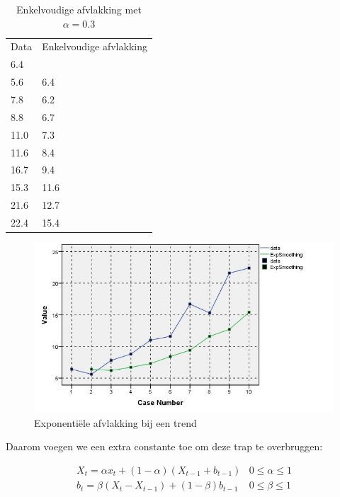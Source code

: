 \begin{table}
\centering
    \begin{tabular}{|ll|}
    \hline
    Data & Enkelvoudige afvlakking \\
    6.4  & ~                      \\
    5.6  & 6.4                    \\
    7.8  & 6.2                    \\
    8.8  & 6.7                    \\
    11.0 & 7.3                    \\
    11.6 & 8.4                    \\
    16.7 & 9.4                    \\
    15.3 & 11.6                   \\
    21.6 & 12.7                   \\
    22.4 & 15.4                   \\ \hline
    \end{tabular}
		\caption{Enkelvoudige afvlakking met $\alpha = 0.3$}
		\label{tab:trend}
\end{table}

\begin{figure}
  \centering
  \includegraphics[width=1.00\textwidth]{images/tijdreeksen/tijdreeks61.jpg}
  \caption{Exponentiële afvlakking bij een trend}
  \label{fig:tijdreeks61}
\end{figure}

Daarom voegen we een extra constante toe om deze trap te overbruggen:

\begin{definition}
\begin{eqnarray}
	X_{t} = \alpha x_{t} + (1-\alpha)(X_{t-1} + b_{t-1}) & 0 \leq \alpha \leq 1 \\
	b_{t} = \beta(X_{t}-X_{t-1}) + (1-\beta)b_{t-1} & 0 \leq \beta \leq 1 
\label{eq:doubleSmoothing}
\end{eqnarray}
\end{definition}

